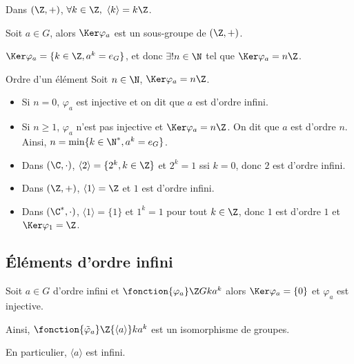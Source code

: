\begin{exemple}
    Dans $(\Z, +)$, $\forall k \in \Z,~\langle k \rangle = k\Z$.
\end{exemple}

\begin{definition}{}{}
    Soit $a \in G$, alors $\Ker \varphi_a$ est un sous-groupe de $(\Z, +)$. 

    $\Ker \varphi_a = \{k \in \Z, a^k = e_G\}$, et donc 
    $\exists ! n \in \N$ tel que $\Ker \varphi_a = n \Z$. 
\end{definition}

\begin{definition}{Ordre d'un élément}{}
    Soit $n \in \N$, $\Ker \varphi_a = n\Z$. 

    \begin{itemize}
        \item Si $n = 0$, $\varphi_a$ est injective et on dit que $a$ est d'ordre infini.
        \item Si $n \geqslant 1$, $\varphi_a$ n'est pas injective et $\Ker \varphi_a = n \Z$.
        On dit que $a$ est d'ordre $n$. Ainsi, $n = \min \{k \in \N^*, a^k = e_G\}$.
    \end{itemize}
\end{definition}

\begin{exemple}
    \begin{itemize}
        \item Dans $(\C,\cdot)$, $\langle 2 \rangle = \{2^k, k \in \Z\}$ et
        $2^k = 1$ ssi $k = 0$, donc $2$ est d'ordre infini.

        \item Dans $(\Z, +)$, $\langle 1 \rangle = \Z$ et $1$ est d'ordre infini.

        \item Dans $(\C^*, \cdot)$, $\langle 1 \rangle = \{1\}$ et
        $1^k = 1$ pour tout $k \in \Z$, donc $1$ est d'ordre $1$ et 
        $\Ker \varphi_1 = \Z$.
    \end{itemize}
\end{exemple}

\subsection{Éléments d'ordre infini}

\begin{proposition}{}{}
    Soit $a \in G$ d'ordre infini et $\fonction {\varphi_a} \Z G k {a^k}$ 
    alors $\Ker \varphi_a = \{0\}$ et $\varphi_a$ est injective.

    Ainsi, $\fonction{\tilde \varphi_a} \Z {\langle a \rangle} k {a^k}$  est un 
    isomorphisme de groupes.

    En particulier, $\langle a \rangle$ est infini.
\end{proposition}

